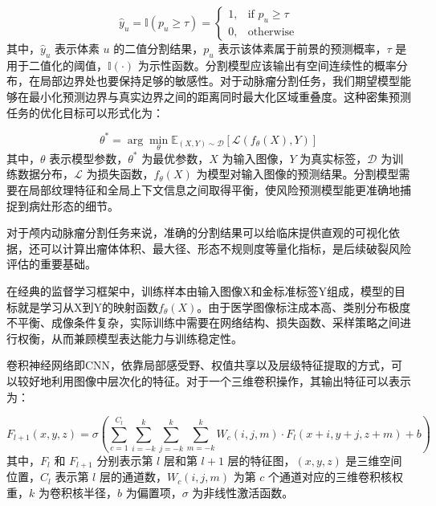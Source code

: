 \begin{equation}
    \hat{y}_u = \mathbb{I}(p_u \geq \tau) = 
    \begin{cases}
        1, & \text{if } p_u \geq \tau \\
        0, & \text{otherwise}
    \end{cases}
    \label{eq:binary-segmentation}
\end{equation}
其中，$\hat{y}_u$ 表示体素 $u$ 的二值分割结果，$p_u$ 表示该体素属于前景的预测概率，$\tau$ 是用于二值化的阈值，$\mathbb{I}(\cdot)$ 为示性函数。分割模型应该输出有空间连续性的概率分布，在局部边界处也要保持足够的敏感性。对于动脉瘤分割任务，我们期望模型能够在最小化预测边界与真实边界之间的距离同时最大化区域重叠度。这种密集预测任务的优化目标可以形式化为：

\begin{equation}
    \theta^* = \arg\min_{\theta} \mathbb{E}_{(X,Y)\sim\mathcal{D}} \left[ \mathcal{L}(f_{\theta}(X), Y) \right]
    \label{eq:segmentation-objective}
\end{equation}
其中，$\theta$ 表示模型参数，$\theta^*$ 为最优参数，$X$ 为输入图像，$Y$ 为真实标签，$\mathcal{D}$ 为训练数据分布，$\mathcal{L}$ 为损失函数，$f_{\theta}(X)$ 为模型对输入图像的预测结果。分割模型需要在局部纹理特征和全局上下文信息之间取得平衡，使风险预测模型能更准确地捕捉到病灶形态的细节。

对于颅内动脉瘤分割任务来说，准确的分割结果可以给临床提供直观的可视化依据，还可以计算出瘤体体积、最大径、形态不规则度等量化指标，是后续破裂风险评估的重要基础。

在经典的监督学习框架中，训练样本由输入图像X和金标准标签Y组成，模型的目标就是学习从X到Y的映射函数$f_{\theta}(X)$。由于医学图像标注成本高、类别分布极度不平衡、成像条件复杂，实际训练中需要在网络结构、损失函数、采样策略之间进行权衡，从而兼顾模型表达能力与训练稳定性。


卷积神经网络即CNN，依靠局部感受野、权值共享以及层级特征提取的方式，可以较好地利用图像中层次化的特征。对于一个三维卷积操作，其输出特征可以表示为：

\begin{equation}
    F_{l+1}(x,y,z) = \sigma\left( \sum_{c=1}^{C_l} \sum_{i=-k}^{k} \sum_{j=-k}^{k} \sum_{m=-k}^{k} W_c(i,j,m) \cdot F_l(x+i, y+j, z+m) + b \right)
    \label{eq:conv3d}
\end{equation}
其中，$F_l$ 和 $F_{l+1}$ 分别表示第 $l$ 层和第 $l+1$ 层的特征图，$(x,y,z)$ 是三维空间位置，$C_l$ 表示第 $l$ 层的通道数，$W_c(i,j,m)$ 为第 $c$ 个通道对应的三维卷积核权重，$k$ 为卷积核半径，$b$ 为偏置项，$\sigma$ 为非线性激活函数。

